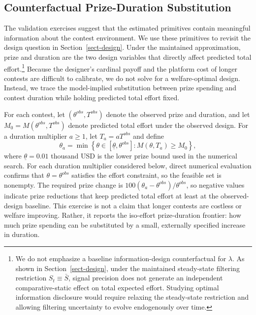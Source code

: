 \documentclass[mnsc]{informs3}
\begin{document}
\subsection{Counterfactual Prize-Duration Substitution}

The validation exercises suggest that the estimated primitives contain
meaningful information about the contest environment. We use these primitives to
revisit the design question in Section~\ref{sect-design}. Under the maintained
approximation, prize and duration are the two design variables that directly
affect predicted total effort.\footnote{
We do not emphasize a baseline information-design counterfactual for
$\lambda$. As shown in Section~\ref{sect-design}, under the maintained
steady-state filtering restriction $S_t\equiv\bar S$, signal precision does not
generate an independent comparative-static effect on total expected effort.
Studying optimal information disclosure would require relaxing the steady-state
restriction and allowing filtering uncertainty to evolve endogenously over time.
}
Because the designer's cardinal payoff and the platform cost of longer contests
are difficult to calibrate, we do not solve for a welfare-optimal design.
Instead, we trace the model-implied substitution between prize spending and
contest duration while holding predicted total effort fixed.

For each contest, let $(\theta^{obs},T^{obs})$ denote the observed prize and
duration, and let
$M_0=M(\theta^{obs},T^{obs})$ denote predicted total effort under the observed
design. For a duration multiplier $a\geq1$, let $T_a=aT^{obs}$ and define
\[
\theta_a
=
\min\left\{
\theta\in[\underline\theta,\theta^{obs}]
:
M(\theta,T_a)\geq M_0
\right\},
\]
where $\underline\theta=0.01$ thousand USD is the lower prize bound used in the numerical search. For each duration multiplier considered below, direct numerical evaluation confirms that $\theta=\theta^{obs}$ satisfies the effort constraint, so the feasible set is nonempty.
The required prize change is
$100(\theta_a-\theta^{obs})/\theta^{obs}$, so negative values indicate prize
reductions that keep predicted total effort at least at the observed-design
baseline. This exercise is not a claim that longer contests are costless or
welfare improving. Rather, it reports the iso-effort prize-duration frontier:
how much prize spending can be substituted by a small, externally specified
increase in duration.
\end{document}
